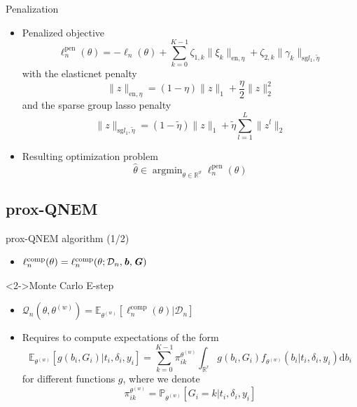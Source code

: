 \documentclass{beamer}
\DeclareMathOperator{\argmin}{argmin}
\newcommand{\dd}{\mathrm{d}}
\newcommand{\E}{\mathbb E}
\newcommand{\R}{\mathbb R}
\renewcommand{\P}{\mathds{P}}
\newcommand{\norm}[1]{\|#1\|}
\newcommand{\cD}{\mathcal D}
\newcommand{\cQ}{\mathcal Q}
\renewcommand{\P}{\mathds P}
\begin{document}
\begin{frame}{Penalization}

\small

\begin{itemize}
  \item<1-> Penalized objective
  \begin{equation*}
  \ell_n^\text{pen}(\theta) = - \ell_n(\theta) + \sum_{k=0}^{K-1} \zeta_{1,k} \norm{\xi_k}_{\text{en}, \eta} + \zeta_{2,k} \norm{\gamma_k}_{\text{sg} l_1, \tilde{\eta}}
  \end{equation*}
  with the elasticnet penalty \[ \norm{z}_{\text{en}, \eta} = (1-\eta)\norm{z}_1 + \dfrac\eta2 \norm{z}_2^2 \] and the sparse group lasso penalty \[ \norm{z}_{\text{sg} l_1, \tilde{\eta}} = (1-\tilde{\eta})\norm{z}_1 + \tilde{\eta} \sum_{l=1}^L\norm{z^l}_2 \]
  \item<2-> Resulting optimization problem \[\hat \theta \in \argmin_{\theta \in \R^\vartheta} \ell_n^\text{pen}(\theta)\]
\end{itemize}

\end{frame}

\subsection{prox-QNEM}

\begin{frame}{prox-QNEM algorithm (1/2)}

\small

\begin{itemize}
  \item<1-> $\ell_n^\text{comp}(\theta) = \ell_n^\text{comp}(\theta ; \cD_n, \textbf{\textit{b}}, \textbf{\textit{G}})$
\end{itemize}

\begin{block}<2->{Monte Carlo E-step}
\begin{itemize}
  \item<2-> $\cQ_n(\theta, \theta^{(w)}) = \E_{\theta^{(w)}}[\ell_n^\text{comp}(\theta) | \cD_n]$
  \item<3-> Requires to compute expectations of the form
  \footnotesize
\[ \E_{\theta^{(w)}}[ g(b_i, G_i) | t_i, \delta_i, y_i] = \sum_{k=0}^{K-1} \pi_{ik}^{\theta^{(w)}} \int_{\R^r} g(b_i, G_i) f_{\theta^{(w)}}(b_i | t_i, \delta_i, y_i) \dd b_i \] 
\small for different functions $g$, where we denote 
\[\pi_{ik}^{\theta^{(w)}} = \P_{\theta^{(w)}}[G_i = k | t_i, \delta_i, y_i] \]
\end{itemize}
\end{block}


\end{frame}
\end{document}
